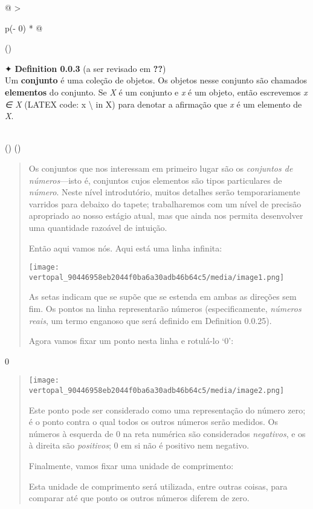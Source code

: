 \documentclass[
]{article}
\begin{document}
\begin{longtable}[]{@{}
  >{\raggedright\arraybackslash}p{(\columnwidth - 0\tabcolsep) * }@{}}
\toprule()
\begin{minipage}[b]{\linewidth}\raggedright
✦ \textbf{Definition 0.0.3} (a ser revisado em \textbf{??})\\
Um \textbf{conjunto} é uma coleção de objetos. Os objetos nesse conjunto
são chamados \textbf{elementos} do conjunto. Se \emph{X} é um conjunto e
\emph{x} é um objeto, então escrevemos \emph{x ∈ X} (LATEX code: x
\textbackslash{} in X) para denotar a afirmação que \emph{x} é um
elemento de \emph{X}.\strut
\end{minipage} \\
\midrule()
\endhead
\bottomrule()
\end{longtable}

\begin{quote}
Os conjuntos que nos interessam em primeiro lugar são os \emph{conjuntos
de números}---isto é, conjuntos cujos elementos são tipos particulares
de \emph{número}. Neste nível introdutório, muitos detalhes serão
temporariamente varridos para debaixo do tapete; trabalharemos com um
nível de precisão apropriado ao nosso estágio atual, mas que ainda nos
permita desenvolver uma quantidade razoável de intuição.

Então aqui vamos nós. Aqui está uma linha infinita:

\texttt{[image: vertopal\_90446958eb2044f0ba6a30adb46b64c5/media/image1.png]}

As setas indicam que se supõe que se estenda em ambas as direções sem
fim. Os pontos na linha representarão números (especificamente,
\emph{números reais}, um termo enganoso que será definido em Definition
0.0.25).

Agora vamos fixar um ponto nesta linha e rotulá-lo `0':
\end{quote}

0

\begin{quote}
\texttt{[image: vertopal\_90446958eb2044f0ba6a30adb46b64c5/media/image2.png]}

Este ponto pode ser considerado como uma representação do número zero; é
o ponto contra o qual todos os outros números serão medidos. Os números
à esquerda de 0 na reta numérica são considerados \emph{negativos}, e os
à direita são \emph{positivos}; 0 em si não é positivo nem negativo.

Finalmente, vamos fixar uma unidade de comprimento:

Esta unidade de comprimento será utilizada, entre outras coisas, para
comparar até que ponto os outros números diferem de zero.
\end{quote}
\end{document}
